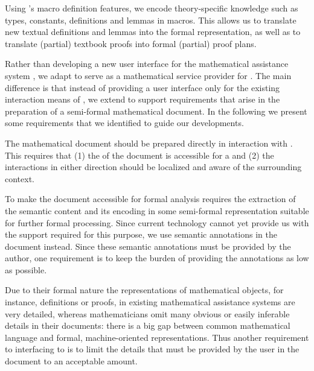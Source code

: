 Using {\texmacs}'s macro definition features, we encode theory-specific knowledge such as
types, constants, definitions and lemmas in macros.  This allows us to translate new
textual definitions and lemmas into the formal representation, as well as to translate
(partial) textbook proofs into formal (partial) proof plans.

Rather than developing a new user interface for the mathematical assistance system
{\OMEGA}, we adapt {\OMEGA} to serve as a mathematical service provider for {\texmacs}.
The main difference is that instead of providing a user interface only for the existing
interaction means of {\OMEGA}, we extend {\OMEGA} to support requirements that arise in
the preparation of a semi-formal mathematical document. In the following we present some
requirements that we identified to guide our
developments.

The mathematical document should be prepared directly in interaction with {\OMEGA}. This
requires that (1) the {} of the document is accessible for a
{} and (2) the interactions in either direction should be
localized and aware of the surrounding context.

To make the document accessible for formal analysis requires the extraction of the
semantic content and its encoding in some semi-formal representation suitable for further
formal processing.  Since current {} technology cannot
yet provide us with the support required for this purpose, we use semantic annotations in
the {\texmacs} document instead. Since these semantic annotations must be provided by the
author, one requirement is to keep the burden of providing the annotations as low as
possible.

Due to their formal nature the representations of mathematical objects, for instance,
definitions or proofs, in existing mathematical assistance systems are very detailed,
whereas mathematicians omit many obvious or easily inferable details in their documents:
there is a big gap between common mathematical language and formal, machine-oriented
representations.  Thus another requirement to interfacing {\texmacs} to {\OMEGA} is to
limit the details that must be provided by the user in the {\texmacs} document to an
acceptable amount.


